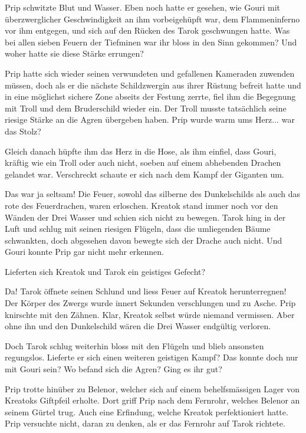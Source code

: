 \documentclass[10pt, a4paper, oneside]{book}
\begin{document}
Prip schwitzte Blut und Wasser. Eben noch hatte er gesehen, wie Gouri mit überzwerglicher Geschwindigkeit an ihm vorbeigehüpft war, dem Flammeninferno vor ihm entgegen, und sich auf den Rücken des Tarok geschwungen hatte. Was bei allen sieben Feuern der Tiefminen war ihr bloss in den Sinn gekommen? Und woher hatte sie diese Stärke errungen?

Prip hatte sich wieder seinen verwundeten und gefallenen Kameraden zuwenden müssen, doch als er die nächste Schildzwergin aus ihrer Rüstung befreit hatte und in eine möglichst sichere Zone abseits der Festung zerrte, fiel ihm die Begegnung mit Troll und dem Bruderschild wieder ein. Der Troll musste tatsächlich seine riesige Stärke an die Agren übergeben haben. Prip wurde warm ums Herz... war das Stolz?

Gleich danach hüpfte ihm das Herz in die Hose, als ihm einfiel, dass Gouri, kräftig wie ein Troll oder auch nicht, soeben auf einem abhebenden Drachen gelandet war. Verschreckt schaute er sich nach dem Kampf der Giganten um.

Das war ja seltsam! Die Feuer, sowohl das silberne des Dunkelschilds als auch das rote des Feuerdrachen, waren erloschen. Kreatok stand immer noch vor den Wänden der Drei Wasser und schien sich nicht zu bewegen. Tarok hing in der Luft und schlug mit seinen riesigen Flügeln, dass die umliegenden Bäume schwankten, doch abgesehen davon bewegte sich der Drache auch nicht. Und Gouri konnte Prip gar nicht mehr erkennen.

Lieferten sich Kreatok und Tarok ein geistiges Gefecht?

Da! Tarok öffnete seinen Schlund und liess Feuer auf Kreatok herunterregnen! Der Körper des Zwergs wurde innert Sekunden verschlungen und zu Asche. Prip knirschte mit den Zähnen. Klar, Kreatok selbst würde niemand vermissen. Aber ohne ihn und den Dunkelschild wären die Drei Wasser endgültig verloren.

Doch Tarok schlug weiterhin bloss mit den Flügeln und blieb ansonsten regungslos. Lieferte er sich einen weiteren geistigen Kampf? Das konnte doch nur mit Gouri sein? Wo befand sich die Agren? Ging es ihr gut?

Prip trotte hinüber zu Belenor, welcher sich auf einem behelfsmässigen Lager von Kreatoks Giftpfeil erholte. Dort griff Prip nach dem Fernrohr, welches Belenor an seinem Gürtel trug. Auch eine Erfindung, welche Kreatok perfektioniert hatte. Prip versuchte nicht, daran zu denken, als er das Fernrohr auf Tarok richtete.
\end{document}

